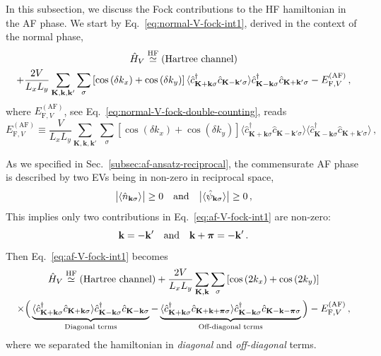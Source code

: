 In this subsection, we discuss the Fock contributions to the HF hamiltonian in the AF phase. We start by Eq.~\eqref{eq:normal-V-fock-int1}, derived in the context of the normal phase,
\begin{multline}
	\hat H_V \stackrel{\mathrm{HF}}{\simeq} (\text{Hartree channel}) \\
	+ \frac{2V}{L_x L_y} \sum_{\mathbf{K}, \mathbf{k}, \mathbf{k}'} \sum_\sigma \left[
	\cos \left(
	\delta k_x
	\right)	+ \cos \left(
	\delta k_y
	\right)	
	\right]
	\langle
	\hat c_{\mathbf{K}+\mathbf{k} \sigma}^\dagger 
	\hat c_{\mathbf{K}-\mathbf{k}' \sigma}
	\rangle
	\hat c_{\mathbf{K}-\mathbf{k} \sigma}^\dagger  \hat c_{\mathbf{K}+\mathbf{k}'\sigma} - E_{\mathrm{F},V}^{(\mathrm{AF})} \, , \label{eq:af-V-fock-int1}
\end{multline}
where $E_{\mathrm{F},V}^{(\mathrm{AF})}$, see Eq.~\eqref{eq:normal-V-fock-double-counting}, reads
\begin{equation}\label{eq:af-V-fock-double-counting}
	E_{\mathrm{F},V}^{(\mathrm{AF})} \equiv \frac{V}{L_x L_y} \sum_{\mathbf{K}, \mathbf{k}, \mathbf{k}'} \sum_\sigma \left[
	\cos \left(
	\delta k_x
	\right)	+ \cos \left(
	\delta k_y
	\right)	
	\right]
	\langle
	\hat c_{\mathbf{K}+\mathbf{k} \sigma}^\dagger 
	\hat c_{\mathbf{K}-\mathbf{k}' \sigma}
	\rangle \langle
	\hat c_{\mathbf{K}-\mathbf{k} \sigma}^\dagger  \hat c_{\mathbf{K}+\mathbf{k}'\sigma} 
	\rangle \, ,
\end{equation}

As we specified in Sec.~\ref{subsec:af-ansatz-reciprocal}, the commensurate AF phase is described by two EVs being in non-zero in reciprocal space,
\[
\big| 
\langle
\hat n_{\mathbf{k}\sigma}
\rangle
\big| \ge 0
\qq{and}
\big| 
\langle
\hat \psi_{\mathbf{k}\sigma}
\rangle
\big| \ge 0 \, ,
\]
This implies only two contributions in Eq.~\eqref{eq:af-V-fock-int1} are non-zero:
\[
\mathbf{k} = -\mathbf{k}'
\qq{and}
\mathbf{k}+\bm{\pi} = -\mathbf{k}' \, .
\]
Then Eq.~\eqref{eq:af-V-fock-int1} becomes
\begin{multline}
	\hat H_V \stackrel{\mathrm{HF}}{\simeq} (\text{Hartree channel}) + \frac{2V}{L_x L_y} \sum_{\mathbf{K}, \mathbf{k}} \sum_\sigma \left[
	\cos \left(
	2k_x
	\right)	+ \cos \left(
	2k_y
	\right)	
	\right]	\\
	\times \Big(
	\underbrace{
		\langle
		\hat c_{\mathbf{K}+\mathbf{k} \sigma}^\dagger 
		\hat 	c_{\mathbf{K}+\mathbf{k} \sigma}
		\rangle
		\hat c_{\mathbf{K}-\mathbf{k} \sigma}^\dagger  \hat c_{\mathbf{K}-\mathbf{k}\sigma}
	}_\text{Diagonal terms}
	-
	\underbrace{
		\langle
		\hat c_{\mathbf{K}+\mathbf{k} \sigma}^\dagger 
		\hat 	c_{\mathbf{K}+\mathbf{k}+\bm{\pi} \sigma}
		\rangle
		\hat c_{\mathbf{K}-\mathbf{k} \sigma}^\dagger  \hat c_{\mathbf{K}-\mathbf{k}-\bm{\pi}\sigma}
	}_\text{Off-diagonal terms} \Big) - E_{\mathrm{F},V}^{(\mathrm{AF})} \, ,
	\label{eq:af-V-fock-int2}
\end{multline}
where we separated the hamiltonian in \textit{diagonal} and \textit{off-diagonal} terms.

